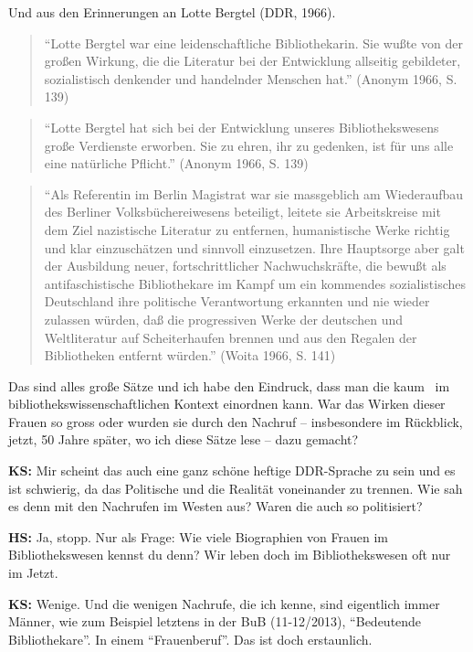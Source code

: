 \documentclass[a4paper,
fontsize=11pt,
oneside,
numbers=noperiodatend,
parskip=half-,
bibliography=totoc,
final
]{scrartcl}
\begin{document}
Und aus den Erinnerungen an Lotte Bergtel (DDR, 1966).

\begin{quote}
\enquote{Lotte Bergtel war eine leidenschaftliche Bibliothekarin. Sie
wußte von der großen Wirkung, die die Literatur bei der Entwicklung
allseitig gebildeter, sozialistisch denkender und handelnder Menschen
hat.} (Anonym 1966, S. 139)
\end{quote}

\begin{quote}
\enquote{Lotte Bergtel hat sich bei der Entwicklung unseres
Bibliothekswesens große Verdienste erworben. Sie zu ehren, ihr zu
gedenken, ist für uns alle eine natürliche Pflicht.} (Anonym 1966, S.
139)
\end{quote}

\begin{quote}
\enquote{Als Referentin im Berlin Magistrat war sie massgeblich am
Wiederaufbau des Berliner Volksbüchereiwesens beteiligt, leitete sie
Arbeitskreise mit dem Ziel nazistische Literatur zu entfernen,
humanistische Werke richtig und klar einzuschätzen und sinnvoll
einzusetzen. Ihre Hauptsorge aber galt der Ausbildung neuer,
fortschrittlicher Nachwuchskräfte, die bewußt als antifaschistische
Bibliothekare im Kampf um ein kommendes sozialistisches Deutschland ihre
politische Verantwortung erkannten und nie wieder zulassen würden, daß
die progressiven Werke der deutschen und Weltliteratur auf
Scheiterhaufen brennen und aus den Regalen der Bibliotheken entfernt
würden.} (Woita 1966, S. 141)
\end{quote}

Das sind alles große Sätze und ich habe den Eindruck, dass man die kaum~
im bibliothekswissenschaftlichen Kontext einordnen kann. War das Wirken
dieser Frauen so gross oder wurden sie durch den Nachruf -- insbesondere
im Rückblick, jetzt, 50 Jahre später, wo ich diese Sätze lese -- dazu
gemacht?

\textbf{KS:} Mir scheint das auch eine ganz schöne heftige DDR-Sprache
zu sein und es ist schwierig, da das Politische und die Realität
voneinander zu trennen. Wie sah es denn mit den Nachrufen im Westen aus?
Waren die auch so politisiert?

\textbf{HS:} Ja, stopp. Nur als Frage: Wie viele Biographien von Frauen
im Bibliothekswesen kennst du denn? Wir leben doch im Bibliothekswesen
oft nur im Jetzt.

\textbf{KS:} Wenige. Und die wenigen Nachrufe, die ich kenne, sind
eigentlich immer Männer, wie zum Beispiel letztens in der BuB
(11-12/2013), \enquote{Bedeutende Bibliothekare}. In einem
\enquote{Frauenberuf}. Das ist doch erstaunlich.
\end{document}
